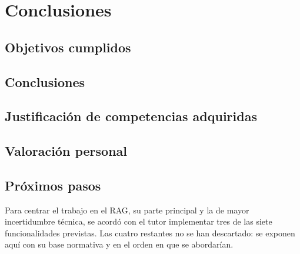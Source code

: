 \chapter{Conclusiones}\label{cap:Conclusiones}

\section{Objetivos cumplidos}\label{sec:ObjetivosCumplidos}

\section{Conclusiones}\label{sec:ConclusionesSDD}

\section{Justificación de competencias adquiridas}\label{sec:Competencias}

\section{Valoración personal}\label{sec:ValoracionPersonal}

\section{Próximos pasos}\label{sec:ProximosPasos}
Para centrar el trabajo en el RAG, su parte principal y la de mayor incertidumbre técnica, se acordó con el tutor implementar tres de las siete funcionalidades previstas. Las cuatro restantes no se han descartado: se exponen aquí con su base normativa y en el orden en que se abordarían.

